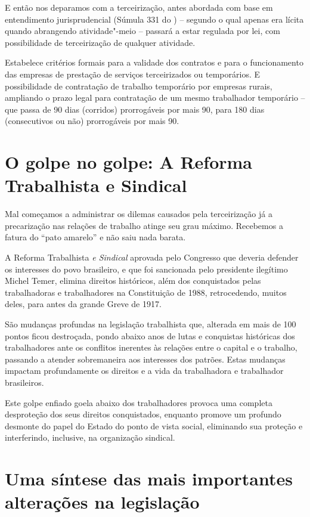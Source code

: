 E então nos deparamos com a terceirização, antes abordada com base em
entendimento jurisprudencial (Súmula 331 do ) -- segundo o qual apenas
era lícita quando abrangendo atividade"-meio -- passará a estar regulada
por lei, com possibilidade de terceirização de qualquer atividade.

Estabelece critérios formais para a validade dos contratos e para o
funcionamento das empresas de prestação de serviços terceirizados ou
temporários. E possibilidade de contratação de trabalho temporário por
empresas rurais, ampliando o prazo legal para contratação de um mesmo
trabalhador temporário -- que passa de 90 dias (corridos) prorrogáveis
por mais 90, para 180 dias (consecutivos ou não) prorrogáveis por mais
90.

\section{O golpe no golpe: A Reforma Trabalhista e Sindical}

Mal começamos a administrar os dilemas causados pela terceirização já a
precarização nas relações de trabalho atinge seu grau máximo. Recebemos
a fatura do ``pato amarelo'' e não saiu nada barata.

A Reforma Trabalhista \emph{e Sindical} aprovada pelo Congresso que
deveria defender os interesses do povo brasileiro, e que foi sancionada
pelo presidente ilegítimo Michel Temer, elimina direitos históricos,
além dos conquistados pelas trabalhadoras e trabalhadores na
Constituição de 1988, retrocedendo, muitos deles, para antes da grande
Greve de 1917.

São mudanças profundas na legislação trabalhista que, alterada em mais
de 100 pontos ficou destroçada, pondo abaixo anos de lutas e conquistas
históricas dos trabalhadores ante os conflitos inerentes às relações
entre o capital e o trabalho, passando a atender sobremaneira aos
interesses dos patrões. Estas mudanças impactam profundamente os
direitos e a vida da trabalhadora e trabalhador brasileiros.

Este golpe enfiado goela abaixo dos trabalhadores provoca uma completa
desproteção dos seus direitos conquistados, enquanto promove um profundo
desmonte do papel do Estado do ponto de vista social, eliminando sua
proteção e interferindo, inclusive, na organização sindical.

\section{Uma síntese das mais importantes alterações na legislação}

